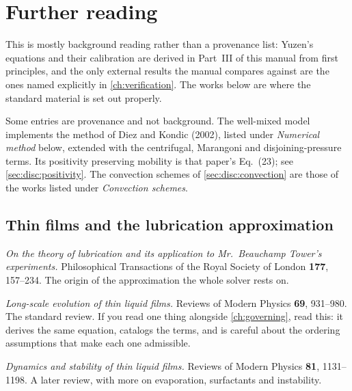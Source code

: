 \chapter*{Further reading}

This is mostly background reading rather than a provenance list: Yuzen's
equations and their calibration are derived in Part~III of this manual from
first principles, and the only external results the manual compares against
are the ones named explicitly in \cref{ch:verification}. The works below are
where the standard material is set out properly.

Some entries are provenance and not background. The well-mixed model
implements the method of Diez and Kondic (2002), listed under \emph{Numerical
method} below, extended with the centrifugal, Marangoni and disjoining-pressure
terms. Its positivity preserving mobility is that paper's Eq.~(23); see
\cref{sec:disc:positivity}. The convection schemes of
\cref{sec:disc:convection} are those of the works listed under
\emph{Convection schemes}.

\section*{Thin films and the lubrication approximation}

\begin{description}[leftmargin=0pt, labelsep=0.5em, style=unboxed]
  \item[O.~Reynolds (1886).] \emph{On the theory of lubrication and its
    application to Mr.~Beauchamp Tower's experiments.} Philosophical
    Transactions of the Royal Society of London \textbf{177}, 157--234. The
    origin of the approximation the whole solver rests on.

  \item[A.~Oron, S.~H.~Davis and S.~G.~Bankoff (1997).] \emph{Long-scale
    evolution of thin liquid films.} Reviews of Modern Physics \textbf{69},
    931--980. The standard review. If you read one thing alongside
    \cref{ch:governing}, read this: it derives the same equation, catalogs
    the terms, and is careful about the ordering assumptions that make each one
    admissible.

  \item[R.~V.~Craster and O.~K.~Matar (2009).] \emph{Dynamics and stability of
    thin liquid films.} Reviews of Modern Physics \textbf{81}, 1131--1198. A
    later review, with more on evaporation, surfactants and instability.
\end{description}

